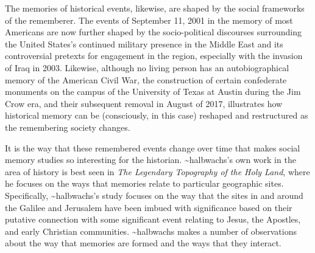 The memories of historical events, likewise, are shaped by the social
frameworks of the rememberer. The events of September 11, 2001 in the
memory of most Americans are now further shaped by the socio-political
discourses surrounding the United States's continued military presence
in the Middle East and its controversial pretexts for engagement in the
region, especially with the invasion of Iraq in 2003. Likewise, although
no living person has an autobiographical memory of the American Civil
War, the construction of certain confederate monuments on the campus of
the University of Texas at Austin during the Jim Crow era, and their
subsequent removal in August of 2017, illustrates how historical memory
can be (consciously, in this case) reshaped and restructured as the
remembering society changes.

It is the way that these remembered events change over time that makes
social memory studies so interesting for the historian.
\textasciitilde{}halbwachs's own work in the area of history is best
seen in \emph{The Legendary Topography of the Holy Land}, where he
focuses on the ways that memories relate to particular geographic sites.
Specifically, \textasciitilde{}halbwachs's study focuses on the way that
the sites in and around the Galilee and Jerusalem have been imbued with
significance based on their putative connection with some significant
event relating to Jesus, the Apostles, and early Christian communities.
\textasciitilde{}halbwachs makes a number of observations about the way
that memories are formed and the ways that they interact.

